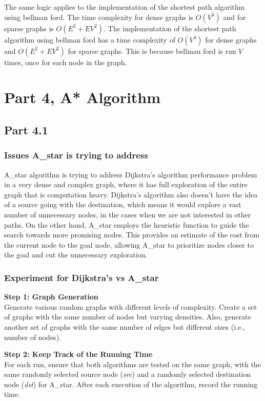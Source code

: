 \documentclass{article}
\begin{document}
\begin{onehalfspace}
\smallskip
The same logic applies to the implementation of the shortest path algorithm using bellman ford. The time complexity for dense graphs is $O(V^3)$ and for sparse graphs is $O(E^2 + EV^2)$.
The implementation of the shortest path algorithm using bellman ford has a time complexity of $O(V^4)$ for dense graphs and $O(E^2 + EV^2)$ for sparse graphs. This is because bellman ford is run $V$ times, once for each node in the graph.



\newpage


\section*{Part 4, A* Algorithm}
\subsection*{Part 4.1}

\subsubsection*{Issues A\_star is trying to address}
A\_star algorithm is trying to address Dijkstra’s algorithm performance problem in a very dense and complex graph, where it has full exploration of the entire graph that is computation heavy. Dijkstra’s algorithm also doesn't have the idea of a source going with the destination, which means it would explore a vast number of unnecessary nodes, in the cases when we are not interested in other paths. On the other hand, A\_star employs the heuristic function to guide the search towards more promising nodes. This provides an estimate of the cost from the current node to the goal node, allowing A\_star to prioritize nodes closer to the goal and cut the unnecessary exploration.



\subsubsection*{Experiment for Dijkstra’s vs A\_star}

\quad  \textbf{Step 1: Graph Generation} \\
Generate various random graphs with different levels of complexity. Create a set of graphs with the same number of nodes but varying densities. Also, generate another set of graphs with the same number of edges but different sizes (i.e., number of nodes).

\vspace{0.5em}
\textbf{Step 2: Keep Track of the Running Time} \\
For each run, ensure that both algorithms are tested on the same graph, with the same randomly selected source node (\textit{src}) and a randomly selected destination node (\textit{dst}) for A\_star. After each execution of the algorithm, record the running time.


\end{onehalfspace}
\end{document}
